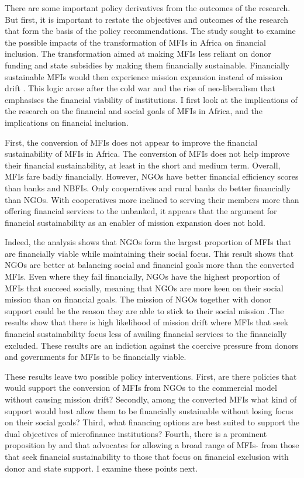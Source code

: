 \documentclass[a4paper, nobind]{templates/ociamthesis}
\begin{document}
There are some important policy derivatives from the outcomes of the research. But first, it is important to restate the objectives and outcomes of the research that form the basis of the policy recommendations. The study sought to examine the possible impacts of the transformation of MFIs in Africa on financial inclusion. The transformation aimed at making MFIs less reliant on donor funding and state subsidies by making them financially sustainable. Financially sustainable MFIs would then experience mission expansion instead of mission drift \autocite{mersland2010microfinance}. This logic arose after the cold war and the rise of neo-liberalism that emphasises the financial viability of institutions. I first look at the implications of the research on the financial and social goals of MFIs in Africa, and the implications on financial inclusion.

First, the conversion of MFIs does not appear to improve the financial sustainability of MFIs in Africa. The conversion of MFIs does not help improve their financial sustainability, at least in the short and medium term. Overall, MFIs fare badly financially. However, NGOs have better financial efficiency scores than banks and NBFIs. Only cooperatives and rural banks do better financially than NGOs. With cooperatives more inclined to serving their members more than offering financial services to the unbanked, it appears that the argument for financial sustainability as an enabler of mission expansion does not hold.

Indeed, the analysis shows that NGOs form the largest proportion of MFIs that are financially viable while maintaining their social focus. This result shows that NGOs are better at balancing social and financial goals more than the converted MFIs. Even where they fail financially, NGOs have the highest proportion of MFIs that succeed socially, meaning that NGOs are more keen on their social mission than on financial goals. The mission of NGOs together with donor support could be the reason they are able to stick to their social mission \autocite{berbegal2019impact}.The results show that there is high likelihood of mission drift where MFIs that seek financial sustainability focus less of availing financial services to the financially excluded. These results are an indiction against the coercive pressure from donors and governments for MFIs to be financially viable.

These results leave two possible policy interventions. First, are there policies that would support the conversion of MFIs from NGOs to the commercial model without causing mission drift? Secondly, among the converted MFIs what kind of support would best allow them to be financially sustainable without losing focus on their social goals? Third, what financing options are best suited to support the dual objectives of microfinance institutions? Fourth, there is a prominent proposition by \textcite{morduch1999microfinance} and \textcite{morduch2000microfinance} that advocates for allowing a broad range of MFIs- from those that seek financial sustainability to those that focus on financial exclusion with donor and state support. I examine these points next.
\end{document}
